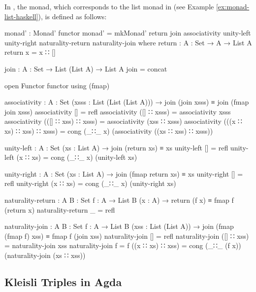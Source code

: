 \begin{example}
  \label{ex:monad-list-agda}

  In \agda, the  monad, which corresponds to the list
  monad in \hask (see Example \ref{ex:monad-list-haskell}), is defined
  as follows:
  \begin{codeagda}
monad' : Monad' functor
monad' = mkMonad' return join associativity unity-left unity-right
                  naturality-return naturality-join
  where
    return : {A : Set} → A → List A
    return x = x ∷ []

    join : {A : Set} → List (List A) → List A
    join = concat

    open Functor functor using (fmap)

    associativity : {A : Set} (xsss : List (List (List A))) →
                    join (join xsss) ≡ join (fmap join xsss)
    associativity []                        = refl
    associativity ([] ∷ xsss)               = associativity xsss
    associativity (([] ∷ xss) ∷ xsss)       =
      associativity (xss ∷ xsss)
    associativity (((x ∷ xs) ∷ xss) ∷ xsss) =
      cong (_∷_ x) (associativity ((xs ∷ xss) ∷ xsss))

    unity-left : {A : Set} (xs : List A) → join (return xs) ≡ xs
    unity-left []       = refl
    unity-left (x ∷ xs) = cong (_∷_ x) (unity-left xs)

    unity-right : {A : Set} (xs : List A) →
                  join (fmap return xs) ≡ xs
    unity-right []       = refl
    unity-right (x ∷ xs) = cong (_∷_ x) (unity-right xs)

    naturality-return : {A B : Set} {f : A → List B} (x : A) →
                        return (f x) ≡ fmap f (return x)
    naturality-return _ = refl

    naturality-join : {A B : Set} {f : A → List B}
                      (xss : List (List A)) →
                      join (fmap (fmap f) xss) ≡ fmap f (join xss)
    naturality-join         []               = refl
    naturality-join         ([] ∷ xss)       = naturality-join xss
    naturality-join {f = f} ((x ∷ xs) ∷ xss) =
      cong (_∷_ (f x)) (naturality-join (xs ∷ xss))
  \end{codeagda}

\end{example}

\subsection{Kleisli Triples in Agda}

